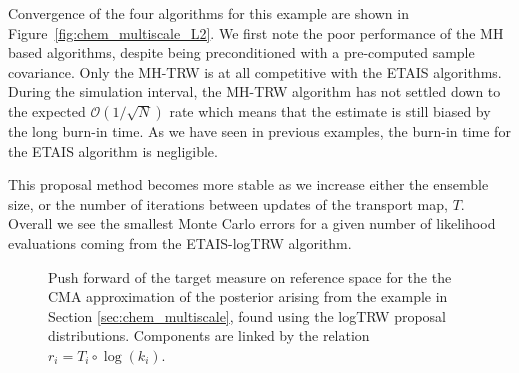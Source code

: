 \documentclass[final]{siamltex}
\newcommand{\edit}[1]{{\color{red} #1}}
\begin{document}
\edit{
Convergence of the four algorithms for this example are shown in
Figure~\ref{fig:chem_multiscale_L2}. We first note the poor
performance of the MH based algorithms, despite being preconditioned
with a pre-computed sample covariance. Only the MH-TRW is at all competitive with the ETAIS algorithms. During the simulation interval, the MH-TRW algorithm has not settled down to the expected $\mathcal{O}(1/\sqrt{N})$ rate which means that the estimate is still biased by the long burn-in time. As we have seen in previous examples, the burn-in time for the ETAIS algorithm is negligible.

This proposal method
becomes more stable as we increase either the ensemble size, or the
number of iterations between updates of the transport map,
$T$. Overall we see the smallest Monte Carlo errors for a given number
of likelihood evaluations coming from the ETAIS-logTRW algorithm.
}

\begin{figure}[!htb]
\centering
\caption{\edit{Push forward of the target measure on reference space for the the CMA
  approximation of the  posterior arising from the example in Section \ref{sec:chem_multiscale}, found using the logTRW proposal distributions. Components are linked by the relation $r_i = T_i\circ\log(k_i)$.}}
\label{fig:chem_reference_spaces}
\end{figure}
\end{document}
